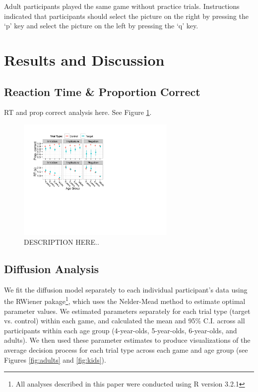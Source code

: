 \documentclass[10pt,letterpaper]{article}
\begin{document}
Adult participants played the same game without practice trials.  Instructions indicated that participants should select the picture on the right by pressing the `p' key and select the picture on the left by pressing the `q' key.  

\section{Results and Discussion}

\subsection{Reaction Time \& Proportion Correct}

RT and prop correct analysis here.  See Figure \ref{fig:traditional}.

\begin{figure}
\begin{center} 
\includegraphics[width=3in]{figures/correct_RT.pdf}
\caption{\label{fig:traditional} DESCRIPTION HERE..}
\end{center} 
\end{figure}

\subsection{Diffusion Analysis}

We fit the diffusion model separately to each individual participant's data using the RWiener pakage\footnote{All analyses described in this paper were conducted using R version 3.2.1}, which uses the Nelder-Mead method to estimate optimal parameter values.  We estimated parameters separately for each trial type (target vs. control) within each game, and calculated the mean and 95\% C.I. across all participants within each age group (4-year-olds, 5-year-olds, 6-year-olds, and adults).  We then used these parameter estimates to produce visualizations of the average decision process for each trial type across each game and age group (see Figures \ref{fig:adults} and \ref{fig:kids}).  
\end{document}
